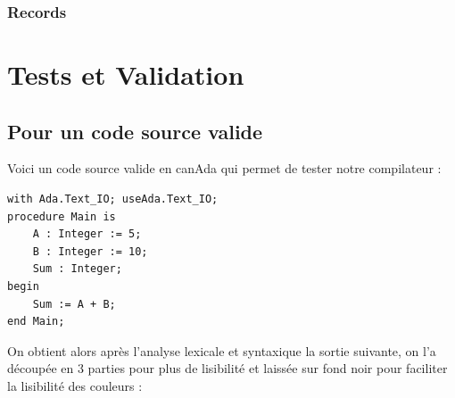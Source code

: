 \documentclass[french,a4paper]{article}
\begin{document}
    \subsubsection{Records}


    \section{Tests et Validation}\label{sec:tests-et-validation}

    \subsection{Pour un code source valide}\label{subsec:pour-un-code-source-valide}

    Voici un code source valide en canAda qui permet de tester notre compilateur :

    \begin{lstlisting}[label={lst:lstlisting16}]
with Ada.Text_IO; useAda.Text_IO;
procedure Main is
    A : Integer := 5;
    B : Integer := 10;
    Sum : Integer;
begin
    Sum := A + B;
end Main;
    \end{lstlisting}

    On obtient alors après l'analyse lexicale et syntaxique la sortie suivante, on l'a découpée en 3 parties pour plus de lisibilité et laissée sur fond noir pour faciliter la lisibilité des couleurs :
\end{document}
